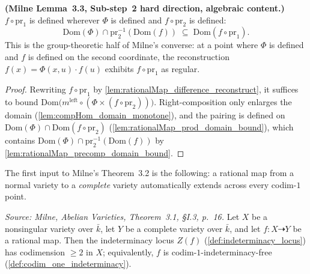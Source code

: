 \begin{lemma}\leanok
  \label{lem:difference_map_domain_reconstruction}
  \textbf{(Milne Lemma~3.3, Sub-step~2 hard direction, algebraic content.)}
  \(f \circ \mathrm{pr}_1\) is defined wherever \(\Phi\) is defined and \(f \circ
  \mathrm{pr}_2\) is defined:
  \[
    \mathrm{Dom}(\Phi) \cap \mathrm{pr}_2^{-1}(\mathrm{Dom}(f)) \;\subseteq\;
    \mathrm{Dom}(f \circ \mathrm{pr}_1) .
  \]
  This is the group-theoretic half of Milne's converse: at a point where \(\Phi\) is
  defined and \(f\) is defined on the second coordinate, the reconstruction
  \(f(x) = \Phi(x,u) \cdot f(u)\) exhibits \(f \circ \mathrm{pr}_1\) as regular.
\end{lemma}
\begin{proof}\leanok
  Rewriting \(f \circ \mathrm{pr}_1\) by
  \cref{lem:rationalMap_difference_reconstruct}, it suffices to bound
  \(\mathrm{Dom}\bigl(m^{\mathrm{left}} \circ (\Phi \times (f \circ \mathrm{pr}_2))\bigr)\).
  Right-composition only enlarges the domain (\cref{lem:compHom_domain_monotone}), and the
  pairing is defined on \(\mathrm{Dom}(\Phi) \cap \mathrm{Dom}(f \circ \mathrm{pr}_2)\)
  (\cref{lem:rationalMap_prod_domain_bound}), which contains \(\mathrm{Dom}(\Phi) \cap
  \mathrm{pr}_2^{-1}(\mathrm{Dom}(f))\) by \cref{lem:rationalMap_precomp_domain_bound}.
\end{proof}

The first input to Milne's Theorem~3.2 is the following: a rational map from a normal
variety to a \emph{complete} variety automatically extends across every codim-\(1\)
point.

\begin{theorem}


  \label{thm:codim_one_extension}
  \textit{Source: Milne, \emph{Abelian Varieties}, Theorem~3.1, \S I.3, p.~16.}
  Let \(X\) be a nonsingular variety over \(\bar k\), let \(Y\) be a complete variety over
  \(\bar k\), and let \(f \colon X \dashrightarrow Y\) be a rational map. Then the
  indeterminacy locus \(Z(f)\) (\cref{def:indeterminacy_locus}) has codimension
  \(\geq 2\) in \(X\); equivalently, \(f\) is codim-\(1\)-indeterminacy-free
  (\cref{def:codim_one_indeterminacy}).
\end{theorem}

